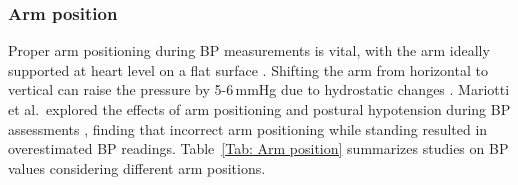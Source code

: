 \documentclass[journal,article,moreauthors]{Definitions/mdpi}
\begin{document}
\subsubsection{Arm position}

Proper arm positioning during BP measurements is vital, with the arm ideally supported at heart level on a flat surface \citep{Netea2003, ogedegbe2010principles, Adiyaman2006}. Shifting the arm from horizontal to vertical can raise the pressure by 5-6\,mmHg due to hydrostatic changes \citep{ogedegbe2010principles}. Mariotti et al.\ explored the effects of arm positioning and postural hypotension during BP assessments \citep{Mariotti1987}, finding that incorrect arm positioning while standing resulted in overestimated BP readings. Table~\ref{Tab: Arm position} summarizes studies on BP values considering different arm positions.
\end{document}

